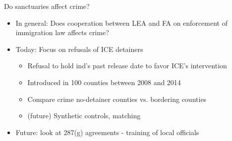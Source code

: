 \documentclass[xcolor=pdftex,dvipsnames,table]{beamer}
\begin{document}
\begin{frame}{ Do sanctuaries affect crime?}
\begin{itemize}
\item In general: Does cooperation between LEA and FA on enforcement of immigration law affects crime?\vspace{0.20cm}
\item Today: Focus on refusals of ICE detainers\vspace{0.20cm}
\begin{itemize}
\item Refusal to hold ind's past release date to favor ICE's intervention\vspace{0.10cm}
\item Introduced in 100 counties between 2008 and 2014\vspace{0.10cm}
\item Compare crime no-detainer counties vs. bordering counties\vspace{0.10cm}
\item (future) Synthetic controls, matching
\end{itemize}\vspace{0.20cm}
\item Future: look at 287(g) agreements - training of local officials
\end{itemize}
\end{frame}
\end{document}

